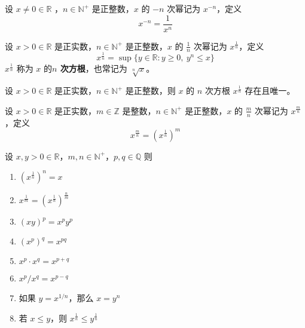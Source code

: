 \begin{definition}[实数的负整数次幂]
    设 $x\neq 0\in\mathbb{R}$ ，$n\in\mathbb{N}^+$ 是正整数，$x$ 的 $-n$ 次幂记为 $x^{-n}$，定义
    \[
        x^{-n} = \frac{1}{x^n}
    \]
\end{definition}

\begin{definition}[正实数的真分数次幂]
    设 $x>0\in\mathbb{R}$ 是正实数，$n\in\mathbb{N}^+$ 是正整数，$x$ 的 $\frac{1}{n}$ 次幂记为 $x^{\frac{1}{n}}$，定义
    \[
        x^{\frac{1}{n}} = \sup\{y\in\mathbb{R}: y\ge 0,\ y^n \le x\}
    \]
    $x^{\frac{1}{n}}$ 称为 $x$ 的\textbf{$n$ 次方根}，也常记为 $\sqrt[n]{x}$。
\end{definition}

\begin{proposition}[n 次方根的存在性]
    设 $x>0\in\mathbb{R}$ 是正实数，$n\in\mathbb{N}^+$ 是正整数，则 $x$ 的 $n$ 次方根 $x^{\frac{1}{n}}$ 存在且唯一。
\end{proposition}

\begin{definition}[正实数的有理数次幂]
    设 $x>0\in\mathbb{R}$ 是正实数，$m\in\mathbb{Z}$ 是整数，$n\in\mathbb{N}^+$ 是正整数，$x$ 的 $\frac{m}{n}$ 次幂记为 $x^{\frac{m}{n}}$，定义
    \[
        x^{\frac{m}{n}} = (x^{\frac{1}{n}})^m
    \]
\end{definition}
\vspace{1em}

\begin{theorem}[正实数的有理数次幂的性质]
    设 $x,y>0\in\mathbb{R}$，$m,n\in\mathbb{N}^+$，$p,q\in\mathbb{Q}$ 则
    \begin{enumerate}
        \item $(x^{\frac{1}{n}})^n = x$
        \item $x^{\frac{1}{m}} = (x^{\frac{1}{n}})^{\frac{n}{m}}$
        \item $(xy)^{p} = x^{p} y^{p}$
        \item $(x^{p})^{q} = x^{pq}$
        \item $x^{p} \cdot x^{q} = x^{p+q}$
        \item $x^{p} / x^{q} = x^{p-q}$
        \item 如果 $y = x^{1/n}$，那么 $x = y^n$
        \item 若 $x\le y$，则 $x^{\frac{1}{n}} \le y^{\frac{1}{n}}$
    \end{enumerate}
\end{theorem}

